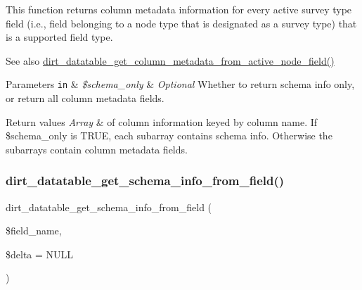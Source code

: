 This function returns column metadata information for every active survey type field (i.\+e., field belonging to a node type that is designated as a survey type) that is a supported field type.

\begin{DoxySeeAlso}{See also}
\mbox{\hyperlink{dirt__datatable_8module_a76e7c95dbdc9c29ce2108bb34ae64604}{dirt\+\_\+datatable\+\_\+get\+\_\+column\+\_\+metadata\+\_\+from\+\_\+active\+\_\+node\+\_\+field()}}
\end{DoxySeeAlso}

\begin{DoxyParams}[1]{Parameters}
\mbox{\tt in}  & {\em \$schema\+\_\+only} & {\itshape Optional} Whether to return schema info only, or return all column metadata fields.\\
\hline
\end{DoxyParams}

\begin{DoxyRetVals}{Return values}
{\em Array} & of column information keyed by column name. If \$schema\+\_\+only is T\+R\+UE, each subarray contains schema info. Otherwise the subarrays contain column metadata fields. \\
\hline
\end{DoxyRetVals}
\mbox{\label{dirt__datatable_8table__schema_8inc_ac1f9a7bc5d7feaccafb207bb82e91f66}} 
\subsubsection{\texorpdfstring{dirt\+\_\+datatable\+\_\+get\+\_\+schema\+\_\+info\+\_\+from\+\_\+field()}{dirt\_datatable\_get\_schema\_info\_from\_field()}}
{\footnotesize\ttfamily dirt\+\_\+datatable\+\_\+get\+\_\+schema\+\_\+info\+\_\+from\+\_\+field (\begin{DoxyParamCaption}\item[{}]{\$field\+\_\+name,  }\item[{}]{\$delta = {\ttfamily NULL} }\end{DoxyParamCaption})}

